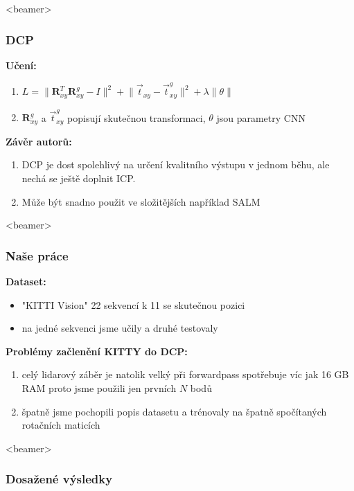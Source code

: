 \documentclass[t]{beamer}
\DeclareMathOperator*{\softmax}{softmax}
\newcommand{\norm}[1]{\lVert #1 \rVert}
\begin{document}
\begin{frame}<beamer>
  \frametitle{DCP}
  \textbf{Učení:}
  \begin{enumerate}
   \item $\displaystyle L=\norm{\textbf{R}_{xy}^T\textbf{R}_{xy}^g-I}^2 + \norm{\vec{t}_{xy}-\vec{t}_{xy}^g}^2+\lambda \norm{\theta}$
   \item $\textbf{R}_{xy}^g$ a $\vec{t}_{xy}^g$ popisují skutečnou transformaci, $\theta$ jsou parametry CNN
	\end{enumerate} 
	\textbf{Závěr autorů:}
	\begin{enumerate}  
    \item DCP je dost spolehlivý na určení kvalitního výstupu v jednom běhu, ale nechá se ještě doplnit ICP.
   \item Může být snadno použit ve složitějších například SALM
  \end{enumerate}  
\end{frame}


\begin{frame}<beamer>
  \frametitle{Naše práce}
  \textbf{Dataset:}
  \begin{itemize}
 	 \item "KITTI Vision"  22 sekvencí k 11 se skutečnou pozici
   \item na jedné sekvenci jsme učily a druhé testovaly
	\end{itemize} 
	\textbf{Problémy začlenění KITTY do DCP:}
	\begin{enumerate}  
    \item celý lidarový záběr je natolik velký při forwardpass spotřebuje víc jak 16 GB RAM
    proto jsme použili jen prvních $N$ bodů
    \item špatně jsme pochopili popis datasetu a trénovaly na špatně spočítaných rotačních maticích
  \end{enumerate}  
\end{frame}

\begin{frame}<beamer>
  \frametitle{Dosažené výsledky}
\end{frame}
\end{document}
